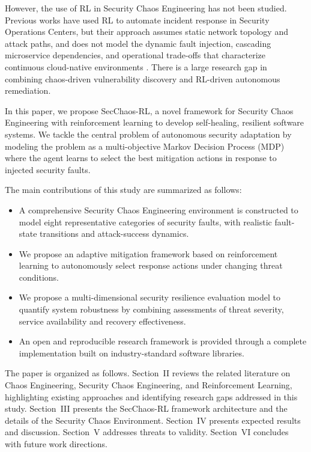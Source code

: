 \documentclass[conference,10pt]{IEEEtran}
\begin{document}
However, the use of RL in Security Chaos Engineering has not been studied. Previous works have used RL to automate incident response in Security Operations Centers, but their approach assumes static network topology and attack paths, and does not model the dynamic fault injection, cascading microservice dependencies, and operational trade-offs that characterize continuous cloud-native environments \cite{standen2021cyborg}. There is a large research gap in combining chaos-driven vulnerability discovery and RL-driven autonomous remediation. 

In this paper, we propose SecChaos-RL, a novel framework for Security Chaos Engineering with reinforcement learning to develop self-healing, resilient software systems. We tackle the central problem of autonomous security adaptation by modeling the problem as a multi-objective Markov Decision Process (MDP) where the agent learns to select the best mitigation actions in response to injected security faults. 

The main contributions of this study are summarized as follows:
\begin{itemize}
	\item A comprehensive Security Chaos Engineering environment is constructed to model eight representative categories of security faults, with realistic fault-state transitions and attack-success dynamics. 
	\item We propose an adaptive mitigation framework based on reinforcement learning to autonomously select response actions under changing threat conditions. 
	\item We propose a multi-dimensional security resilience evaluation model to quantify system robustness by combining assessments of threat severity, service availability and recovery effectiveness. 
	\item An open and reproducible research framework is provided through a complete implementation built on industry-standard software libraries. 
\end{itemize}

The paper is organized as follows. Section~II reviews the related literature on Chaos Engineering, Security Chaos Engineering, and Reinforcement Learning, highlighting existing approaches and identifying research gaps addressed in this study. Section~III presents the SecChaos-RL framework architecture and the details of the Security Chaos Environment. Section~IV presents expected results and discussion. Section~V addresses threats to validity. Section~VI concludes with future work directions.
\end{document}
